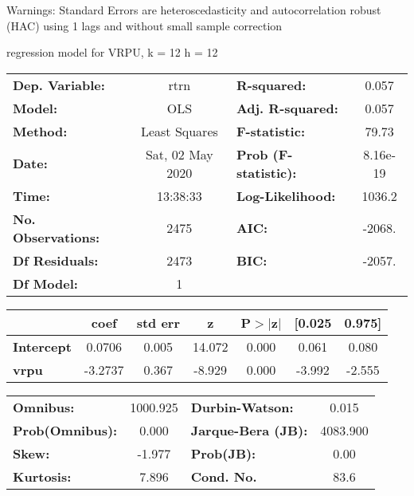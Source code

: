 Warnings: \newline
 [1] Standard Errors are heteroscedasticity and autocorrelation robust (HAC) using 1 lags and without small sample correction\ 

regression model for VRPU, k = 12 h = 12\begin{center}
\begin{tabular}{lclc}
\toprule
\textbf{Dep. Variable:}    &       rtrn       & \textbf{  R-squared:         } &     0.057   \\
\textbf{Model:}            &       OLS        & \textbf{  Adj. R-squared:    } &     0.057   \\
\textbf{Method:}           &  Least Squares   & \textbf{  F-statistic:       } &     79.73   \\
\textbf{Date:}             & Sat, 02 May 2020 & \textbf{  Prob (F-statistic):} &  8.16e-19   \\
\textbf{Time:}             &     13:38:33     & \textbf{  Log-Likelihood:    } &    1036.2   \\
\textbf{No. Observations:} &        2475      & \textbf{  AIC:               } &    -2068.   \\
\textbf{Df Residuals:}     &        2473      & \textbf{  BIC:               } &    -2057.   \\
\textbf{Df Model:}         &           1      & \textbf{                     } &             \\
\bottomrule
\end{tabular}
\begin{tabular}{lcccccc}
                   & \textbf{coef} & \textbf{std err} & \textbf{z} & \textbf{P$> |$z$|$} & \textbf{[0.025} & \textbf{0.975]}  \\
\midrule
\textbf{Intercept} &       0.0706  &        0.005     &    14.072  &         0.000        &        0.061    &        0.080     \\
\textbf{vrpu}      &      -3.2737  &        0.367     &    -8.929  &         0.000        &       -3.992    &       -2.555     \\
\bottomrule
\end{tabular}
\begin{tabular}{lclc}
\textbf{Omnibus:}       & 1000.925 & \textbf{  Durbin-Watson:     } &    0.015  \\
\textbf{Prob(Omnibus):} &   0.000  & \textbf{  Jarque-Bera (JB):  } & 4083.900  \\
\textbf{Skew:}          &  -1.977  & \textbf{  Prob(JB):          } &     0.00  \\
\textbf{Kurtosis:}      &   7.896  & \textbf{  Cond. No.          } &     83.6  \\
\bottomrule
\end{tabular}
\end{center}

